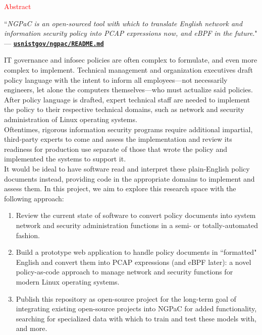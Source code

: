 \documentclass[11pt]{article}
\begin{document}
\begin{blackbox}{\begin{center}\LARGE\textcolor{red}{Abstract}\end{center}}
    \normalfont
    \begin{center}
        \large``\textit{NGPaC is an open-sourced tool with which to translate English network and information security policy into PCAP expressions now, and eBPF in the future}." \\
        --- \href{https://github.com/usnistgov/ngpac/tree/main}{\texttt{\textbf{usnistgov/ngpac/README.md}}}
    \end{center}
    
    \normalsize\phantom{~~~~} IT governance and infosec policies are often complex to formulate, and even more complex to implement. Technical management and organization executives draft policy language with the intent to inform all employees---not necessarily engineers, let alone the computers themselves---who must actualize said policies. After policy language is drafted, expert technical staff are needed to implement the policy to their respective technical domains, such as network and security administration of Linux operating systems. \\
    \phantom{~~~~} Oftentimes, rigorous information security programs require additional impartial, third-party experts to come and assess the implementation and review its readiness for production use separate of those that wrote the policy and implemented the systems to support it. \\
    \phantom{~~~~} It would be ideal to have software read and interpret these plain-English policy documents instead, providing code in the appropriate domains to implement and assess them. In this project, we aim to explore this research space with the following approach:

    \begin{enumerate}
        \item Review the current state of software to convert policy documents into system network and security administration functions in a semi- or totally-automated fashion.

        \item Build a prototype web application to handle policy documents in ``formatted" English and convert them into PCAP expressions (and eBPF later): a novel policy-as-code approach to manage network and security functions for modern Linux operating systems.

        \item Publish this repository as open-source project for the long-term goal of integrating existing open-source projects into NGPaC for added functionality, searching for specialized data with which to train and test these models with, and more.
    \end{enumerate}
\end{blackbox}
\end{document}
